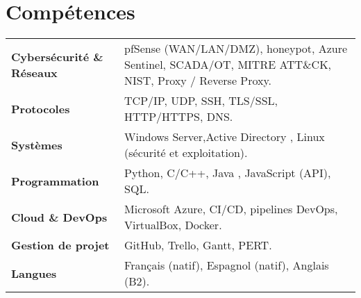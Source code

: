 \documentclass[a4paper,10pt]{article}
\begin{document}
\section*{Compétences}

\begin{tabular}{p{4.5cm} p{15cm}}
\textbf{Cybersécurité \& Réseaux} & pfSense (WAN/LAN/DMZ), honeypot, Azure Sentinel, SCADA/OT, MITRE ATT\&CK, NIST, Proxy / Reverse Proxy. \\
\textbf{Protocoles} & TCP/IP, UDP, SSH, TLS/SSL, HTTP/HTTPS, DNS. \\
\textbf{Systèmes} & Windows Server,Active Directory , Linux (sécurité et exploitation). \\
\textbf{Programmation} & Python, C/C++, Java , JavaScript (API), SQL. \\

\textbf{Cloud \& DevOps} & Microsoft Azure, CI/CD, pipelines DevOps, VirtualBox, Docker. \\

\textbf{Gestion de projet} & GitHub, Trello, Gantt, PERT. \\
\textbf{Langues} & Français (natif), Espagnol (natif), Anglais (B2). \\
\end{tabular}
\end{document}
